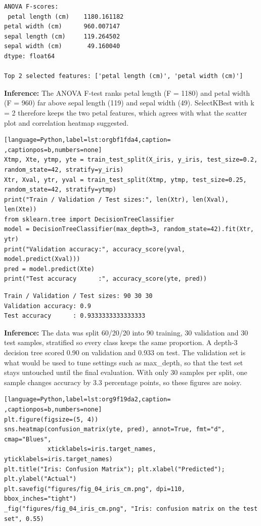 \documentclass[11pt]{article}
\begin{document}
\begin{verbatim}
ANOVA F-scores:
 petal length (cm)    1180.161182
petal width (cm)      960.007147
sepal length (cm)     119.264502
sepal width (cm)       49.160040
dtype: float64

Top 2 selected features: ['petal length (cm)', 'petal width (cm)']
\end{verbatim}


\textbf{Inference:} The ANOVA F-test ranks petal length (F = 1180) and petal width (F = 960) far above sepal
length (119) and sepal width (49). SelectKBest with k = 2 therefore keeps the two petal
features, which agrees with what the scatter plot and correlation heatmap suggested.
\begin{lstlisting}[language=Python,label=lst:orgbf1fda4,caption= ,captionpos=b,numbers=none]
Xtmp, Xte, ytmp, yte = train_test_split(X_iris, y_iris, test_size=0.2, random_state=42, stratify=y_iris)
Xtr, Xval, ytr, yval = train_test_split(Xtmp, ytmp, test_size=0.25, random_state=42, stratify=ytmp)
print("Train / Validation / Test sizes:", len(Xtr), len(Xval), len(Xte))
from sklearn.tree import DecisionTreeClassifier
model = DecisionTreeClassifier(max_depth=3, random_state=42).fit(Xtr, ytr)
print("Validation accuracy:", accuracy_score(yval, model.predict(Xval)))
pred = model.predict(Xte)
print("Test accuracy      :", accuracy_score(yte, pred))
\end{lstlisting}

\begin{verbatim}
Train / Validation / Test sizes: 90 30 30
Validation accuracy: 0.9
Test accuracy      : 0.9333333333333333
\end{verbatim}


\textbf{Inference:} The data was split 60/20/20 into 90 training, 30 validation and 30 test samples, stratified
so every class keeps the same proportion. A depth-3 decision tree scored 0.90 on validation
and 0.933 on test. The validation set is what would be used to tune settings such as
max\_depth, so that the test set stays untouched until the final evaluation. With only 30
samples per split, one sample changes accuracy by 3.3 percentage points, so these figures
are noisy.
\begin{lstlisting}[language=Python,label=lst:org9f19da2,caption= ,captionpos=b,numbers=none]
plt.figure(figsize=(5, 4))
sns.heatmap(confusion_matrix(yte, pred), annot=True, fmt="d", cmap="Blues",
            xticklabels=iris.target_names, yticklabels=iris.target_names)
plt.title("Iris: Confusion Matrix"); plt.xlabel("Predicted"); plt.ylabel("Actual")
plt.savefig("figures/fig_04_iris_cm.png", dpi=110, bbox_inches="tight")
_fig("figures/fig_04_iris_cm.png", "Iris: confusion matrix on the test set", 0.55)
\end{lstlisting}
\end{document}
